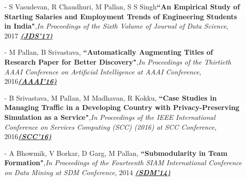 \documentclass[margin,line]{res}
\begin{document}
\begin{resume}
\begin{itemize}
\item[-]S Vasudevan, R Chaudhuri, M Pallan, S S Singh{\bf ``An Empirical Study of Starting Salaries and Employment Trends of Engineering Students in India"},{\em In Proceedings of the Sixth Volume of Journal of Data Science}, 2017 {\bf \href{http://epubs.siam.org/doi/pdf/10.1137/1.9781611973440.102}{\em (JDS'17)}}

\item[-] M Pallan, B Srivastava, {\bf ``Automatically Augmenting Titles of Research Paper for Better Discovery"},{\em In Proceedings of the Thirtieth AAAI Conference on Artificial Intelligence at AAAI Conference}, 2016{\bf \href{https://www.aaai.org/ocs/index.php/WS/AAAIW16/paper/view/12578/12441}{\em (AAAI'16)}}

\item[-] B Srivastava, M Pallan, M Madhavan, R Kokku, {\bf ``Case Studies in Managing Traffic in a Developing Country with Privacy-Preserving Simulation as a Service"},{\em In Proceedings of the IEEE International Conference on Services Computing (SCC) (2016) at SCC Conference}, 2016{\bf \href{https://www.computer.org/csdl/proceedings/scc/2016/2628/00/2628a766-abs.html}{\em (SCC'16)}}

\item[-] A Bhowmik, V Borkar, D Garg, M Pallan, {\bf ``Submodularity in Team Formation"},{\em In Proceedings of the Fourteenth SIAM International Conference on Data Mining at SDM Conference}, 2014 {\bf \href{http://epubs.siam.org/doi/pdf/10.1137/1.9781611973440.102}{\em (SDM'14)}}

\end{itemize}


\end{resume}
\end{document}
